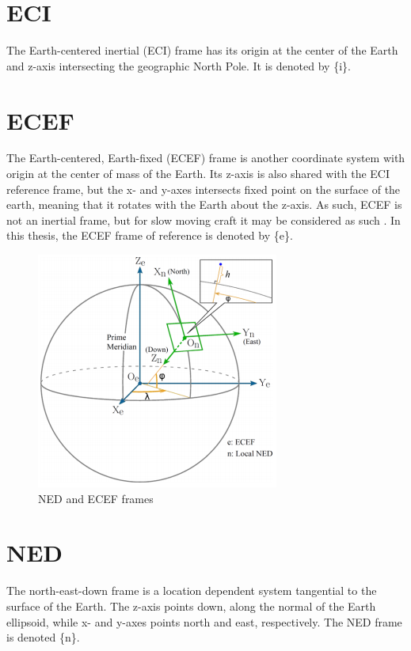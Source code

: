 
\section{ECI}
    The Earth-centered inertial (ECI) frame has its origin at the center of the Earth and z-axis intersecting the geographic North Pole. It is denoted by \{i\}.
    

\section{ECEF}
    The Earth-centered, Earth-fixed (ECEF) frame is another coordinate system with origin at the center of mass of the Earth. Its z-axis is also shared with the ECI reference frame, but the x- and y-axes intersects fixed point on the surface of the earth, meaning that it rotates with the Earth about the z-axis. As such, ECEF is not an inertial frame, but for slow moving craft it may be considered as such \cite{fossen2011handbook}. In this thesis, the ECEF frame of reference is denoted by \{e\}. 
    
    \begin{figure}
        \centering
        \includegraphics[scale=1]{Appendices/bilder/ECEF_ENU_BETTER.png}
        \caption{NED and ECEF frames}
        \label{fig:ecef-enu}
    \end{figure}
    
\section{NED}
    The north-east-down frame is a location dependent system tangential to the surface of the Earth. The z-axis points down, along the normal of the Earth ellipsoid, while x- and y-axes points north and east, respectively. The NED frame is denoted \{n\}.


